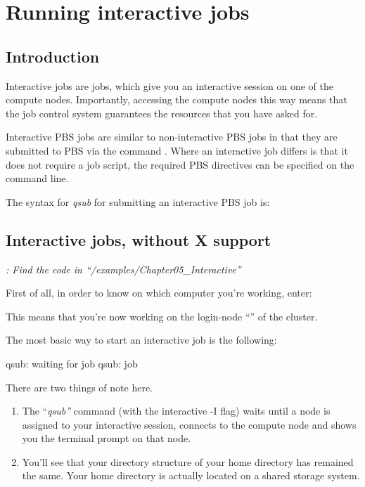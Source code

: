 \chapter{Running interactive jobs}

\section{Introduction}

Interactive jobs are jobs, which give you an interactive session on one of the
compute nodes. Importantly, accessing the compute nodes this way means that the
job control system guarantees the resources that you have asked for.

Interactive PBS jobs are similar to non-interactive PBS jobs in that they are
submitted to PBS via the command . Where an interactive job
differs is that it does not require a job script, the required PBS directives
can be specified on the command line.

The syntax for \emph{qsub} for submitting an interactive PBS job is:
\begin{prompt}
\end{prompt}

\section{Interactive jobs, without X support}

\emph{: Find the code in
``\tilde/examples/Chapter05\_Interactive''}

First of all, in order to know on which computer you're working, enter:
\begin{prompt}
\end{prompt}

This means that you're now working on the login-node ``\emph{\loginnode}'' of
the \hpc cluster.

The most basic way to start an interactive job is the following:
\begin{prompt}
qsub: waiting for job %
qsub: job %
\end{prompt}

There are two things of note here.

\begin{enumerate}
  \item  The ``\emph{qsub''} command (with the interactive -I
      flag) waits until a node is assigned to your interactive session,
      connects to the compute node and shows you the terminal prompt on that
      node.
  \item  You'll see that your directory structure of your home directory has
      remained the same. Your home directory is actually located on a shared
      storage system.
\end{enumerate}

